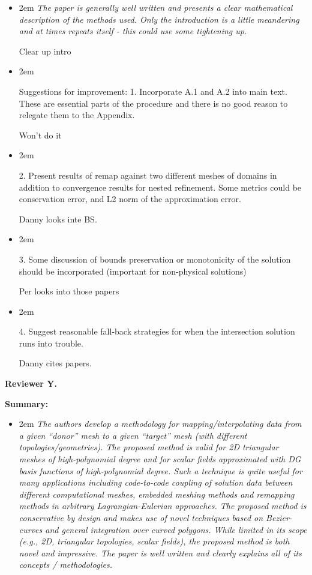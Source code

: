 \documentclass{letter}
\renewcommand{\rq}[1]{\begin{addmargin}[2em]{2em}
\it
#1
\end{addmargin}\vspace{12pt}}
\begin{document}
\begin{letter}{}
\begin{itemize}
Thank you

\item \rq{The paper is generally well written and presents a clear mathematical
description of the methods used. Only the introduction is a little
meandering and at times repeats itself - this could use some
tightening up.}

Clear up intro
  
\item \rq{
Suggestions for improvement:
1. Incorporate A.1 and A.2 into main text. These are essential parts of the procedure and there is no good reason to relegate them to the Appendix.}

Won't do it
  
\item \rq{  
2. Present results of remap against two different meshes of domains in addition
to convergence results for nested refinement. Some metrics could be
conservation error, and L2 norm of the approximation error.}

Danny looks inte BS.
  
\item \rq{
  3. Some discussion of bounds preservation or monotonicity of the solution should be incorporated (important for non-physical solutions)}

Per looks into those papers

  
  \item \rq{
4. Suggest reasonable fall-back strategies for when the intersection solution runs into trouble.}

Danny cites papers.
    
\end{itemize}


\textbf{Reviewer Y.}

\textbf{Summary:}

\begin{itemize} \renewcommand\labelitemi{--}

\item \rq{The authors develop a methodology for mapping/interpolating data from a given “donor” mesh to a given “target” mesh (with different topologies/geometries). The proposed method is valid for 2D triangular meshes of high-polynomial degree and for scalar fields approximated with DG basis functions of high-polynomial degree. Such a technique is quite useful for many applications including code-to-code coupling of solution data between different computational meshes, embedded meshing methods and remapping methods in arbitrary Lagrangian-Eulerian approaches. The proposed method is conservative by design and makes use of novel techniques based on Bezier-curves and general integration over curved polygons. While limited in its scope (e.g., 2D, triangular topologies, scalar fields), the proposed method is both novel and impressive. The paper is well written and clearly explains all of its concepts / methodologies. 
}


\end{itemize}
\end{letter}
\end{document}
